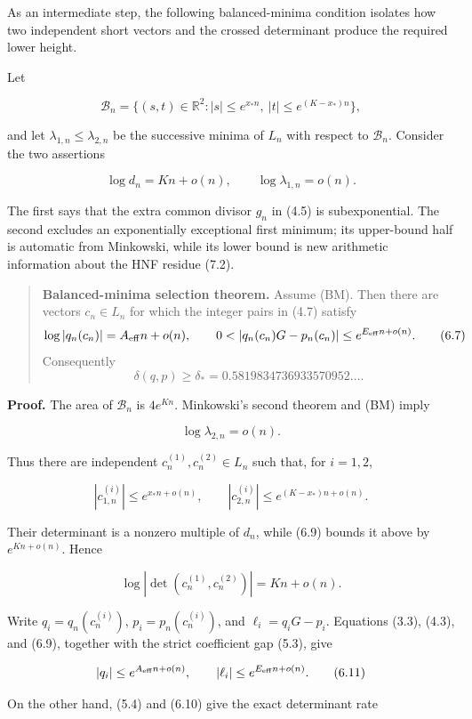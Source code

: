 \documentclass[
  11pt,
]{article}
\begin{document}
As an intermediate step, the following balanced-minima condition
isolates how two independent short vectors and the crossed determinant
produce the required lower height.

Let

\[
 \mathcal B_n=\{(s,t)\in\mathbb R^2:
 |s|\le e^{x_*n},\ |t|\le e^{(K-x_*)n}\},
 \tag{6.6}
\]

and let \(\lambda_{1,n}\le\lambda_{2,n}\) be the successive minima of
\(L_n\) with respect to \(\mathcal B_n\). Consider the two assertions

\[
 \log d_n=Kn+o(n),\qquad \log\lambda_{1,n}=o(n).
 \tag{BM}
\]

The first says that the extra common divisor \(g_n\) in (4.5) is
subexponential. The second excludes an exponentially exceptional first
minimum; its upper-bound half is automatic from Minkowski, while its
lower bound is new arithmetic information about the HNF residue (7.2).

\begin{quote}
\textbf{Balanced-minima selection theorem.} Assume (BM). Then there are
vectors \(c_n\in L_n\) for which the integer pairs in (4.7) satisfy \[
\log|q_n(c_n)|=A_{\rm eff}n+o(n),\qquad
0<|q_n(c_n)G-p_n(c_n)|\le e^{E_{\rm eff}n+o(n)}.       \tag{6.7}
\] Consequently \[
\delta(q,p)\ge\delta_*=0.5819834736933570952\ldots .  \tag{6.8}
\]
\end{quote}

\textbf{Proof.} The area of \(\mathcal B_n\) is \(4e^{Kn}\). Minkowski's
second theorem and (BM) imply

\[
 \log\lambda_{2,n}=o(n).
\]

Thus there are independent \(c_n^{(1)},c_n^{(2)}\in L_n\) such that, for
\(i=1,2\),

\[
 |c_{1,n}^{(i)}|\le e^{x_*n+o(n)},\qquad
 |c_{2,n}^{(i)}|\le e^{(K-x_*)n+o(n)}.                \tag{6.9}
\]

Their determinant is a nonzero multiple of \(d_n\), while (6.9) bounds
it above by \(e^{Kn+o(n)}\). Hence

\[
 \log|\det(c_n^{(1)},c_n^{(2)})|=Kn+o(n).             \tag{6.10}
\]

Write \(q_i=q_n(c_n^{(i)})\), \(p_i=p_n(c_n^{(i)})\), and
\(\ell_i=q_iG-p_i\). Equations (3.3), (4.3), and (6.9), together with
the strict coefficient gap (5.3), give

\[
 |q_i|\le e^{A_{\rm eff}n+o(n)},\qquad
 |\ell_i|\le e^{E_{\rm eff}n+o(n)}.                  \tag{6.11}
\]

On the other hand, (5.4) and (6.10) give the exact determinant rate
\end{document}
